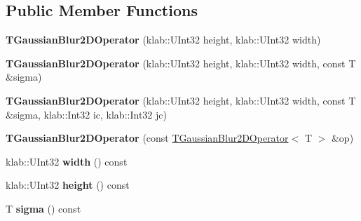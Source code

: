 \subsection*{Public Member Functions}
\begin{DoxyCompactItemize}
\item 
{\bfseries T\+Gaussian\+Blur2\+D\+Operator} (klab\+::\+U\+Int32 height, klab\+::\+U\+Int32 width)\hypertarget{classkl1p_1_1TGaussianBlur2DOperator_a865a2ce1fb6cf509a69b956c8f939f95}{}\label{classkl1p_1_1TGaussianBlur2DOperator_a865a2ce1fb6cf509a69b956c8f939f95}

\item 
{\bfseries T\+Gaussian\+Blur2\+D\+Operator} (klab\+::\+U\+Int32 height, klab\+::\+U\+Int32 width, const T \&sigma)\hypertarget{classkl1p_1_1TGaussianBlur2DOperator_ae76cd1b72456270dab3c0c556c4accdf}{}\label{classkl1p_1_1TGaussianBlur2DOperator_ae76cd1b72456270dab3c0c556c4accdf}

\item 
{\bfseries T\+Gaussian\+Blur2\+D\+Operator} (klab\+::\+U\+Int32 height, klab\+::\+U\+Int32 width, const T \&sigma, klab\+::\+Int32 ic, klab\+::\+Int32 jc)\hypertarget{classkl1p_1_1TGaussianBlur2DOperator_a63e8ccb771b703b31a788ce2c80867f6}{}\label{classkl1p_1_1TGaussianBlur2DOperator_a63e8ccb771b703b31a788ce2c80867f6}

\item 
{\bfseries T\+Gaussian\+Blur2\+D\+Operator} (const \hyperlink{classkl1p_1_1TGaussianBlur2DOperator}{T\+Gaussian\+Blur2\+D\+Operator}$<$ T $>$ \&op)\hypertarget{classkl1p_1_1TGaussianBlur2DOperator_a1402713b9c3e03697ae535faa7e6ee10}{}\label{classkl1p_1_1TGaussianBlur2DOperator_a1402713b9c3e03697ae535faa7e6ee10}

\item 
klab\+::\+U\+Int32 {\bfseries width} () const \hypertarget{classkl1p_1_1TGaussianBlur2DOperator_a0df3a16fd7f0f83cda459c6fc81a4069}{}\label{classkl1p_1_1TGaussianBlur2DOperator_a0df3a16fd7f0f83cda459c6fc81a4069}

\item 
klab\+::\+U\+Int32 {\bfseries height} () const \hypertarget{classkl1p_1_1TGaussianBlur2DOperator_a321b40c7e045971b4dd3e83e381e50d4}{}\label{classkl1p_1_1TGaussianBlur2DOperator_a321b40c7e045971b4dd3e83e381e50d4}

\item 
T {\bfseries sigma} () const \hypertarget{classkl1p_1_1TGaussianBlur2DOperator_a446b4b2b40139cb69205cb994f533b76}{}\label{classkl1p_1_1TGaussianBlur2DOperator_a446b4b2b40139cb69205cb994f533b76}


\end{DoxyCompactItemize}
